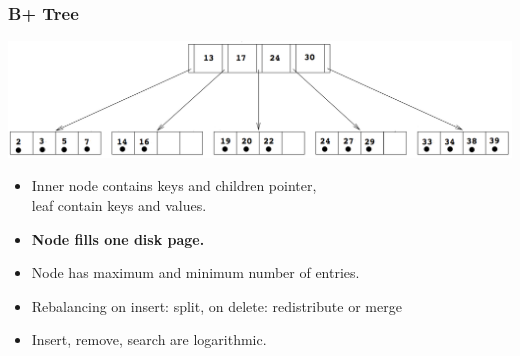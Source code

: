\documentclass{beamer}
\begin{document}
    \begin{frame}
      \frametitle{B+ Tree}
      \vspace{-1em}
      \includegraphics[scale=0.2]{B+Tree.png}
      \vspace{2em}
      \begin{itemize}
        \item Inner node contains keys and children pointer, \\leaf contain keys and values.
        \item \textbf{Node fills one disk page.}
        \item Node has maximum and minimum number of entries.
        \pause
        \item Rebalancing on insert: split, on delete: redistribute or merge
        \pause
        \item Insert, remove, search are logarithmic.
      \end{itemize}
    \end{frame}
\end{document}
